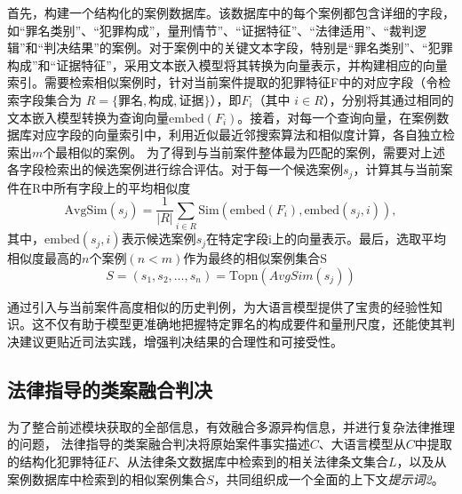 首先，构建一个结构化的案例数据库。该数据库中的每个案例都包含详细的字段，如“罪名类别”、“犯罪构成”，量刑情节”、“证据特征”、“法律适用”、“裁判逻辑”和“判决结果”的案例。对于案例中的关键文本字段，特别是“罪名类别”、“犯罪构成”和“证据特征”，采用文本嵌入模型将其转换为向量表示，并构建相应的向量索引。需要检索相似案例时，针对当前案件提取的犯罪特征F中的对应字段（令检索字段集合为 $R=\{\text{罪名},\text{构成},\text{证据}\}$），即$F_{i}$​（其中 $i \in R$），分别将其通过相同的文本嵌入模型转换为查询向量$\text{embed}(F_{i})$。接着，对每一个查询向量，在案例数据库对应字段的向量索引中，利用近似最近邻搜索算法和相似度计算，各自独立检索出$m$个最相似的案例。
为了得到与当前案件整体最为匹配的案例，需要对上述各字段检索出的候选案例进行综合评估。对于每一个候选案例$s_j$​，计算其与当前案件在R中所有字段上的平均相似度
{
\small
\begin{equation}
    \text{AvgSim}(s_j) = \frac{1}{|R|} \sum_{i \in R} \text{Sim}\left( \text{embed}(F_i), \text{embed}(s_j, i) \right),
\end{equation}
}
其中，$\text{embed}(s_j,i)$表示候选案例$s_j$​在特定字段$\text{i}$上的向量表示。最后，选取平均相似度最高的$n$个案例$(n<m)$作为最终的相似案例集合S
\begin{equation}
	S=(s_1​,s_2​,\dots,s_n​)=\text{Topn​}(AvgSim(s_j​))
\end{equation}

通过引入与当前案件高度相似的历史判例，为大语言模型提供了宝贵的经验性知识。这不仅有助于模型更准确地把握特定罪名的构成要件和量刑尺度，还能使其判决建议更贴近司法实践，增强判决结果的合理性和可接受性。

\subsection{\heiti 法律指导的类案融合判决}

为了整合前述模块获取的全部信息，有效融合多源异构信息，并进行复杂法律推理的问题， 法律指导的类案融合判决将原始案件事实描述$C$、大语言模型从$C$中提取的结构化犯罪特征$F$、从法律条文数据库中检索到的相关法律条文集合$L$，以及从案例数据库中检索到的相似案例集合$S$，共同组织成一个全面的上下文\textit{提示词2}。

